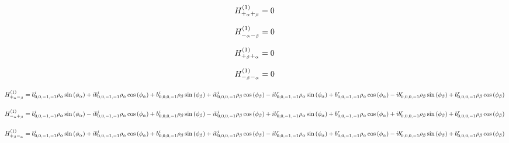 \documentclass[fleqn]{article}
\begin{document}
\begin{dmath*}
H_{+_{\alpha}+_{\beta}}^{(1)}=0\\
\end{dmath*}

\begin{dmath*}
H_{-_{\alpha}-_{\beta}}^{(1)}=0\\
\end{dmath*}

\begin{dmath*}
H_{+_{\beta}+_{\alpha}}^{(1)}=0\\
\end{dmath*}

\begin{dmath*}
H_{-_{\beta}-_{\alpha}}^{(1)}=0\\
\end{dmath*}

\begin{dmath*}
H_{+_{\alpha}-_{\beta}}^{(1)}=b^{i}_{0,0,-1,-1} \rho_{\alpha} \sin{\left (\phi_{\alpha} \right )} +  i b^{i}_{0,0,-1,-1} \rho_{\alpha} \cos{\left (\phi_{\alpha} \right )} + b^{i}_{0,0,0,-1} \rho_{\beta} \sin{\left (\phi_{\beta} \right )} +  i b^{i}_{0,0,0,-1} \rho_{\beta} \cos{\left (\phi_{\beta} \right )} -  i b^{r}_{0,0,-1,-1} \rho_{\alpha} \sin{\left (\phi_{\alpha} \right )} + b^{r}_{0,0,-1,-1} \rho_{\alpha} \cos{\left (\phi_{\alpha} \right )} -  i b^{r}_{0,0,0,-1} \rho_{\beta} \sin{\left (\phi_{\beta} \right )} + b^{r}_{0,0,0,-1} \rho_{\beta} \cos{\left (\phi_{\beta} \right )}\\
\end{dmath*}

\begin{dmath*}
H_{-_{\alpha}+_{\beta}}^{(1)}=b^{i}_{0,0,-1,-1} \rho_{\alpha} \sin{\left (\phi_{\alpha} \right )} -  i b^{i}_{0,0,-1,-1} \rho_{\alpha} \cos{\left (\phi_{\alpha} \right )} + b^{i}_{0,0,0,-1} \rho_{\beta} \sin{\left (\phi_{\beta} \right )} -  i b^{i}_{0,0,0,-1} \rho_{\beta} \cos{\left (\phi_{\beta} \right )} +  i b^{r}_{0,0,-1,-1} \rho_{\alpha} \sin{\left (\phi_{\alpha} \right )} + b^{r}_{0,0,-1,-1} \rho_{\alpha} \cos{\left (\phi_{\alpha} \right )} +  i b^{r}_{0,0,0,-1} \rho_{\beta} \sin{\left (\phi_{\beta} \right )} + b^{r}_{0,0,0,-1} \rho_{\beta} \cos{\left (\phi_{\beta} \right )}\\
\end{dmath*}

\begin{dmath*}
H_{+_{\beta}-_{\alpha}}^{(1)}=b^{i}_{0,0,-1,-1} \rho_{\alpha} \sin{\left (\phi_{\alpha} \right )} +  i b^{i}_{0,0,-1,-1} \rho_{\alpha} \cos{\left (\phi_{\alpha} \right )} + b^{i}_{0,0,0,-1} \rho_{\beta} \sin{\left (\phi_{\beta} \right )} +  i b^{i}_{0,0,0,-1} \rho_{\beta} \cos{\left (\phi_{\beta} \right )} -  i b^{r}_{0,0,-1,-1} \rho_{\alpha} \sin{\left (\phi_{\alpha} \right )} + b^{r}_{0,0,-1,-1} \rho_{\alpha} \cos{\left (\phi_{\alpha} \right )} -  i b^{r}_{0,0,0,-1} \rho_{\beta} \sin{\left (\phi_{\beta} \right )} + b^{r}_{0,0,0,-1} \rho_{\beta} \cos{\left (\phi_{\beta} \right )}\\
\end{dmath*}
\end{document}
